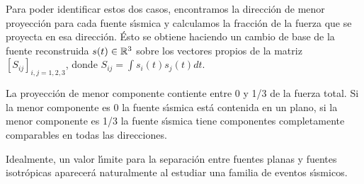Para poder identificar estos dos casos, encontramos la direcci\'on de
menor proyecci\'on para cada fuente s\'{\i}smica y
calculamos la fracci\'on de la fuerza que se proyecta en esa direcci\'on.
\'Esto se obtiene haciendo un cambio de base de la
fuente reconstruida $s(t)\in \mathbb{R}^3$ sobre los vectores propios de la
matriz $[S_{ij}]_{i,j=1,2,3}$, donde $S_{ij}=\int s_i(t)s_j(t) dt$.

La proyecci\'on de menor componente contiente
entre 0 y 1/3 de la fuerza total. Si la menor componente
es 0 la fuente s\'{\i}smica est\'a contenida en un plano, si la menor componente es 1/3
 la fuente s\'{\i}smica
tiene componentes completamente comparables en todas las direcciones.

Idealmente, un valor l\'{\i}mite para la separaci\'on entre fuentes planas y fuentes isotr\'opicas
aparecer\'a naturalmente al estudiar una familia de eventos s\'{\i}smicos.


